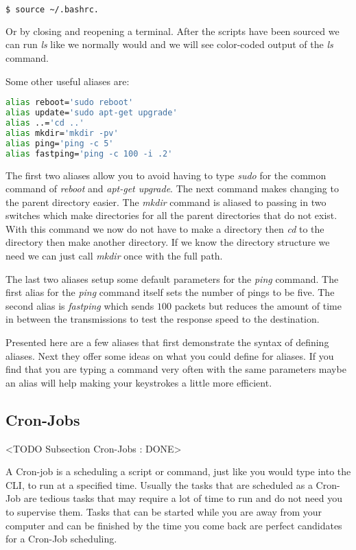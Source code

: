 \begin{lstlisting}[language=bash]
	$ source ~/.bashrc.
\end{lstlisting}

Or by closing and reopening a terminal. After the scripts have been sourced we can run \emph{ls} like we normally would and we will see color-coded output of the \emph{ls} command. 

Some other useful aliases are:

\begin{lstlisting}[language=bash]
alias reboot='sudo reboot'
alias update='sudo apt-get upgrade'
alias ..='cd ..'
alias mkdir='mkdir -pv'
alias ping='ping -c 5'
alias fastping='ping -c 100 -i .2'
\end{lstlisting}
	
The first two aliases allow you to avoid having to type \emph{sudo} for the common command of \emph{reboot} and \emph{apt-get upgrade}. The next command makes changing to the parent directory easier. The \emph{mkdir} command is aliased to passing in two switches which make directories for all the parent directories that do not exist. With this command we now do not have to make a directory then \emph{cd} to the directory then make another directory. If we know the directory structure we need we can just call \emph{mkdir} once with the full path. 

The last two aliases setup some default parameters for the \emph{ping} command. The first alias for the \emph{ping} command itself sets the number of pings to be five. The second alias is \emph{fastping} which sends $100$ packets but reduces the amount of time in between the transmissions to test the response speed to the destination. 

Presented here are a few aliases that first demonstrate the syntax of defining aliases. Next they offer some ideas on what you could define for aliases. If you find that you are typing a command very often with the same parameters maybe an alias will help making your keystrokes a little more efficient. 
	
\subsection{Cron-Jobs}
	<TODO Subsection Cron-Jobs : DONE>

A Cron-job is a scheduling a script or command, just like you would type into the \ac{CLI}, to run at a specified time. Usually the tasks that are scheduled as a Cron-Job are tedious tasks that may require a lot of time to run and do not need you to supervise them. Tasks that can be started while you are away from your computer and can be finished by the time you come back are perfect candidates for a Cron-Job scheduling. 
	
